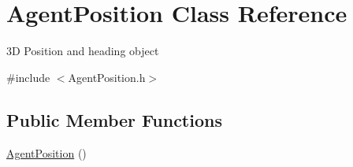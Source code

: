 \hypertarget{class_agent_position}{
\section{AgentPosition Class Reference}
\label{class_agent_position}
}


3D Position and heading object  




{\ttfamily \#include $<$AgentPosition.h$>$}

\subsection*{Public Member Functions}
\begin{DoxyCompactItemize}
\item 
\hypertarget{class_agent_position_aacfae8d984a7b741db32578b32f2d9c3}{
\hyperlink{class_agent_position_aacfae8d984a7b741db32578b32f2d9c3}{AgentPosition} ()}
\label{class_agent_position_aacfae8d984a7b741db32578b32f2d9c3}


\end{DoxyCompactItemize}
